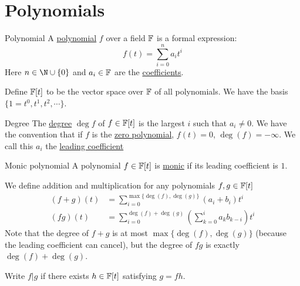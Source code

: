 \documentclass[../Main.tex]{subfiles}
\begin{document}
\section{Polynomials}
\begin{definition}{Polynomial}
    A \underline{polynomial} $f$ over a field $\mathbb{F}$ is a formal expression:
    \begin{equation*}
        f(t) = \sum_{i=0}^{n} a_i t^i
    \end{equation*}
    Here $n \in \N \cup \{0\}$ and $a_i \in \mathbb{F}$ are the \underline{coefficients}.
\end{definition}
Define $\mathbb{F}[t]$ to be the vector space over $\mathbb{F}$ of all polynomials. We have the basis $\{1 = t^0, t^1, t^2, \cdots\}$.

\begin{definition}{Degree}
    The \underline{degree} $\deg{f}$ of $f \in \mathbb{F}[t]$ is the largest $i$ such that $a_i \neq 0$. We have the convention that if $f$ is the \underline{zero polynomial}, $f(t) = 0$, $\deg(f) = -\infty$.
    We call this $a_i$ the \underline{leading coefficient}
\end{definition}
\begin{definition}{Monic polynomial}
    A polynomial $f \in \mathbb{F}[t]$ is \underline{monic} if its leading coefficient is $1$.
\end{definition}
We define addition and multiplication for any polynomials $f, g \in \mathbb{F}[t]$
\begin{align*}
    (f + g)(t) &= \sum_{i=0}^{\max\{\deg(f), \deg(g)\}} (a_i + b_i)t^i \\
    (fg)(t) &= \sum_{i=0}^{\deg(f) + \deg(g)} \left(\sum_{k=0}^{i} a_kb_{k-i}\right)t^i
\end{align*}
Note that the degree of $f + g$ is at most $\max\{\deg(f), \deg(g)\}$ (because the leading coefficient can cancel), but the degree of $fg$ is exactly $\deg(f) + \deg(g)$.

Write $f | g$ if there exists $h \in \mathbb{F}[t]$ satisfying $g = fh$.
\end{document}
